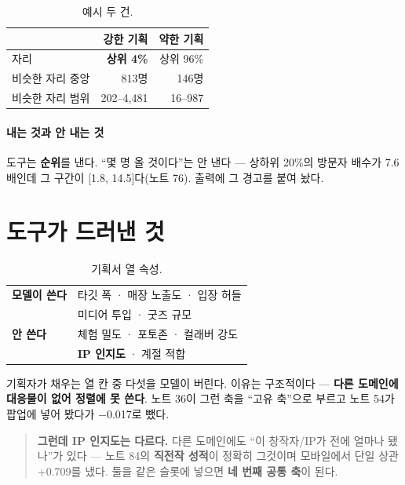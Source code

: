 \documentclass[10pt]{article}
\begin{document}
\begin{table}[t]
\centering\tsize
\caption{예시 두 건.}
\begin{tabular}{lrr}
\toprule
& 강한 기획 & 약한 기획 \\
\midrule
자리 & \textbf{상위 4\%} & 상위 96\% \\
비슷한 자리 중앙 & 813명 & 146명 \\
비슷한 자리 범위 & 202--4,481 & 16--987 \\
\bottomrule
\end{tabular}
\end{table}


\paragraph{내는 것과 안 내는 것}
도구는 \textbf{순위}를 낸다. ``몇 명 올 것이다''는 안 낸다 --- 상하위 20\%의
방문자 배수가 7.6배인데 그 구간이 $[$1.8, 14.5$]$다(노트 76). 출력에 그
경고를 붙여 놨다.

\section{도구가 드러낸 것}

\begin{table}[t]
\centering\tsize
\caption{기획서 열 속성.}
\begin{tabular}{ll}
\toprule
\textbf{모델이 쓴다} & 타깃 폭 · 매장 노출도 · 입장 허들 \\
 & 미디어 투입 · 굿즈 규모 \\
\midrule
\textbf{안 쓴다} & 체험 밀도 · 포토존 · 컬래버 강도 \\
 & \textbf{IP 인지도} · 계절 적합 \\
\bottomrule
\end{tabular}
\end{table}

기획자가 채우는 열 칸 중 다섯을 모델이 버린다. 이유는 구조적이다 ---
\textbf{다른 도메인에 대응물이 없어 정렬에 못 쓴다}. 노트 36이 그런 축을 ``고유
축''으로 부르고 노트 54가 팝업에 넣어 봤다가 $-$0.017로 뺐다.

\begin{quote}\fontsize{9.5}{11.5}\selectfont
\textbf{그런데 IP 인지도는 다르다.} 다른 도메인에도 ``이 창작자/IP가 전에 얼마나
됐나''가 있다 --- 노트 84의 \textbf{직전작 성적}이 정확히 그것이며 모바일에서
단일 상관 $+$0.709를 냈다. 둘을 같은 슬롯에 넣으면 \textbf{네 번째 공통 축}이
된다.
\end{quote}
\end{document}
